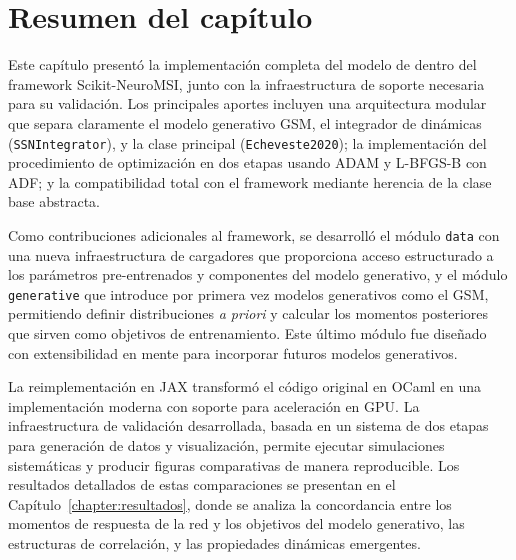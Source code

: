 
\section{Resumen del capítulo}
\label{sec:impl_resumen}

Este capítulo presentó la implementación completa del modelo de \citeauthor{echeveste2020cortical} dentro del framework Scikit-NeuroMSI, junto con la infraestructura de soporte necesaria para su validación. Los principales aportes incluyen una arquitectura modular que separa claramente el modelo generativo \acrshort{GSM}, el integrador de dinámicas (\texttt{SSNIntegrator}), y la clase principal (\texttt{Echeveste2020}); la implementación del procedimiento de optimización en dos etapas usando \acrshort{ADAM} y \acrshort{L-BFGS-B} con \acrshort{ADF}; y la compatibilidad total con el framework mediante herencia de la clase base abstracta.

Como contribuciones adicionales al framework, se desarrolló el módulo \texttt{data} con una nueva infraestructura de cargadores que proporciona acceso estructurado a los parámetros pre-entrenados y componentes del modelo generativo, y el módulo \texttt{generative} que introduce por primera vez modelos generativos como el \acrshort{GSM}, permitiendo definir distribuciones \textit{a priori} y calcular los momentos posteriores que sirven como objetivos de entrenamiento. Este último módulo fue diseñado con extensibilidad en mente para incorporar futuros modelos generativos.

La reimplementación en JAX transformó el código original en OCaml en una implementación moderna con soporte para aceleración en \acrshort{GPU}. La infraestructura de validación desarrollada, basada en un sistema de dos etapas para generación de datos y visualización, permite ejecutar simulaciones sistemáticas y producir figuras comparativas de manera reproducible. Los resultados detallados de estas comparaciones se presentan en el Capítulo~\ref{chapter:resultados}, donde se analiza la concordancia entre los momentos de respuesta de la red y los objetivos del modelo generativo, las estructuras de correlación, y las propiedades dinámicas emergentes.